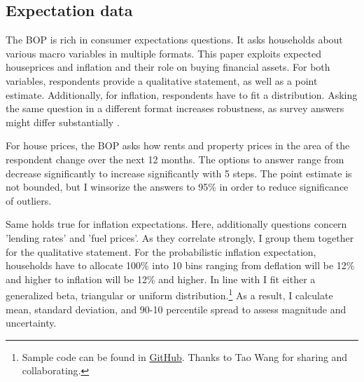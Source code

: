 \documentclass[ProjectABM]{subfiles}
\begin{document}


\subsection{Expectation data}
The BOP is rich in consumer expectations questions. It asks households about various macro variables in multiple formats. This paper exploits expected houseprices and inflation and their role on buying financial assets. For both variables, respondents provide a qualitative statement, as well as a point estimate. Additionally, for inflation, respondents have to fit a distribution. Asking the same question in a different format increases robustness, as survey answers might differ substantially \cite{potter_et_al_2017prob,diercks2021asymmetric}.

For house prices, the BOP asks how rents and property prices in the area of the respondent change over the next 12 months. The options to answer range from decrease significantly to increase significantly with 5 steps. The point estimate is not bounded, but I winsorize the answers to 95\% in order to reduce significance of outliers.

Same holds true for inflation expectations. Here, additionally questions concern 'lending rates' and 'fuel prices'. As they correlate strongly, I group them together for the qualitative statement. For the probabilistic inflation expectation, households have to allocate 100\% into 10 bins ranging from deflation will be 12\% and higher to inflation will be 12\% and higher. In line with \cite{engelberg_manski_2009distribution} I fit either a generalized beta, triangular or uniform distribution.\footnote{Sample code can be found in \href{https://github.com/AMonninger/DensitySurveyEstimation}{GitHub}. Thanks to Tao Wang for sharing and collaborating.} As a result, I calculate mean, standard deviation, and 90-10 percentile spread to assess magnitude and uncertainty.




\end{document}
